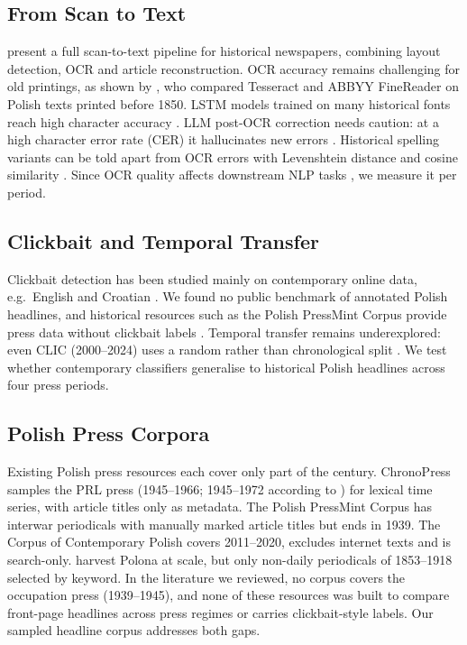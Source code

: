 \documentclass[11pt]{article}
\begin{document}
\subsection{From Scan to Text}
 present a full scan-to-text pipeline for historical newspapers, combining layout detection, OCR and article reconstruction. OCR accuracy remains challenging for old printings, as shown by , who compared Tesseract and ABBYY FineReader on Polish texts printed before 1850. LSTM models trained on many historical fonts reach high character accuracy \cite{springmann2016ocr}. LLM post-OCR correction needs caution: at a high character error rate (CER) it hallucinates new errors \cite{koynov2025opportunities}. Historical spelling variants can be told apart from OCR errors with Levenshtein distance and cosine similarity \cite{gralinski2020mining}. Since OCR quality affects downstream NLP tasks \cite{van2020assessing}, we measure it per period.

\subsection{Clickbait and Temporal Transfer}

Clickbait detection has been studied mainly on contemporary online data, e.g.\ English and Croatian \cite{potthast2018crowdsourcing,andelic2025clic}. We found no public benchmark of annotated Polish headlines, and historical resources such as the Polish PressMint Corpus provide press data without clickbait labels \cite{ogrodniczuk-etal-2026-polish}. Temporal transfer remains underexplored: even CLIC (2000--2024) uses a random rather than chronological split \cite{andelic2025clic}. We test whether contemporary classifiers generalise to historical Polish headlines across four press periods.

\subsection{Polish Press Corpora}
Existing Polish press resources each cover only part of the century. ChronoPress \cite{Pawłowski_2024} samples the PRL press (1945--1966; 1945--1972 according to ) for lexical time series, with article titles only as metadata. The Polish PressMint Corpus \cite{ogrodniczuk-etal-2026-polish} has interwar periodicals with manually marked article titles but ends in 1939. The Corpus of Contemporary Polish \cite{kie:etal:26} covers 2011--2020, excludes internet texts and is search-only.  harvest Polona at scale, but only non-daily periodicals of 1853--1918 selected by keyword. In the literature we reviewed, no corpus covers the occupation press (1939--1945), and none of these resources was built to compare front-page headlines across press regimes or carries clickbait-style labels. Our sampled headline corpus addresses both gaps.
\end{document}
